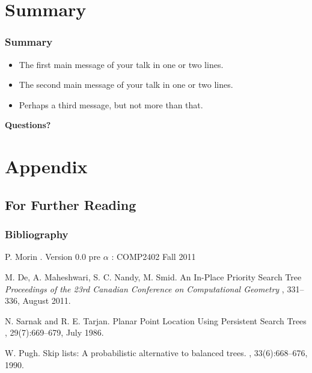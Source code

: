 \documentclass{beamer}
\begin{document}
\section*{Summary}

\begin{frame}
  \frametitle<presentation>{Summary}

  \begin{itemize}
  \item
    The \alert{first main message} of your talk in one or two lines.
  \item
    The \alert{second main message} of your talk in one or two lines.
  \item
    Perhaps a \alert{third message}, but not more than that.
  \end{itemize}

\end{frame}

\begin{frame}
  \begin{center}
    {\bf Questions?}
  \end{center}
\end{frame}

\section*{Appendix}

\subsection*{For Further Reading}

\begin{frame}
  \frametitle<presentation>{Bibliography}

  \begin{thebibliography}{10}
    
  \beamertemplatebookbibitems

    P. Morin
    .
    \newblock Version 0.0 pre $\alpha$ : COMP2402 Fall 2011
    
  \beamertemplatearticlebibitems

    M. De, A. Maheshwari, S. C. Nandy, M. Smid.
    \newblock An In-Place Priority Search Tree
    \newblock
    {
      \em Proceedings of the 23rd Canadian Conference on Computational Geometry
    },
    331--336, August 2011.

    N. Sarnak and R. E. Tarjan.
    \newblock Planar Point Location Using Persistent Search Trees
    ,
    29(7):669--679, July 1986.

    W. Pugh.
    \newblock Skip lists: A probabilistic alternative to balanced trees.
    ,
    33(6):668--676, 1990.

  \end{thebibliography}
\end{frame}
\end{document}

